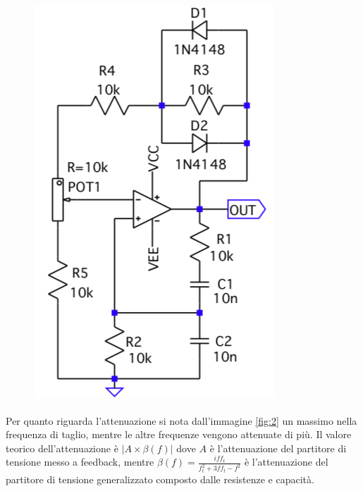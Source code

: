 \documentclass{article}
\begin{document}
\begin{figure}[htb]
\begin{minipage}[t]{.5\linewidth}
			\includegraphics[width=\linewidth]{figure/circ2.png}
			\label{fig:circ2}
	    \end{minipage}
	\end{figure}
	Per quanto riguarda l'attenuazione si nota dall'immagine \ref{fig:2} un massimo nella frequenza di taglio, mentre le altre frequenze vengono attenuate di più.\newline
	Il valore teorico dell'attenuazione è $|A\times\beta(f)|$ dove $A$ è l'attenuazione del partitore di tensione messo a feedback, mentre $\beta(f)=\frac{iff_t}{f_t^2+3ff_t-f^2}$ è l'attenuazione del partitore di tensione generalizzato composto dalle resistenze e capacità.\newline
\end{document}
